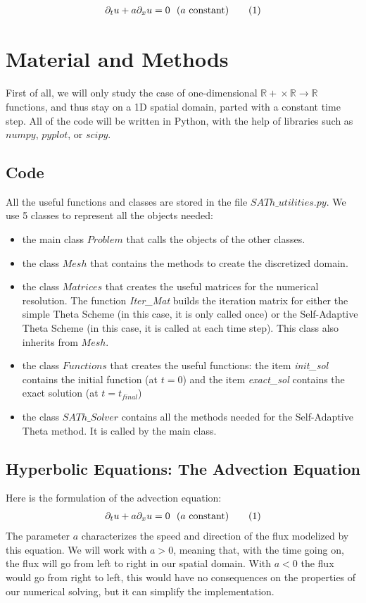 \documentclass[12pt]{article}
\begin{document}
\begin{align*}
    \partial_t u + a\partial_x u = 0 \text{\space \space ($a$ constant)} \tag{1}
\end{align*}
\vspace{10pt}



\section{Material and Methods}
First of all, we will only study the case of one-dimensional $\mathbb{R+} \times \mathbb{R} \rightarrow \mathbb{R}$ functions, and thus stay on a 1D spatial domain, parted with a constant time step.
All of the code will be written in Python, with the help of libraries such as $numpy$, $pyplot$, or $scipy$.

\subsection{Code}
All the useful functions and classes are stored in the file $SATh\_utilities.py$.
We use 5 classes to represent all the objects needed:
\begin{itemize}
    \item the main class $Problem$ that calls the objects of the other classes.
    \item the class $Mesh$ that contains the methods to create the discretized domain.
    \item the class $Matrices$ that creates the useful matrices for the numerical resolution. The function \emph{Iter\_Mat}
builds the iteration matrix for either the simple Theta Scheme (in this case, it is only called once) or the Self-Adaptive Theta Scheme (in this case, it is called at each time step).
This class also inherits from $Mesh$.
    \item the class $Functions$ that creates the useful functions: the item \emph{init\_sol} contains the initial function (at $t=0$) and the item \emph{exact\_sol} contains the exact solution (at $t=t_{final}$)
    \item the class $SATh\_Solver$ contains all the methods needed for the Self-Adaptive Theta method. It is called by the main class.
\end{itemize}

\subsection{Hyperbolic Equations: The Advection Equation}
Here is the formulation of the advection equation:
\begin{align*}
    \partial_t u + a\partial_x u = 0 \text{\space \space ($a$ constant)} \tag{1}
\end{align*}
The parameter $a$ characterizes the speed and direction of the flux modelized by this equation.
We will work with $a > 0$, meaning that, with the time going on, the flux will go from left to right in our spatial domain.
With $a < 0$ the flux would go from right to left, this would have no consequences on the properties of our numerical solving, but it can simplify the implementation.
\end{document}
